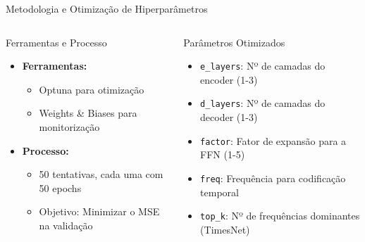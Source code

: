 \documentclass[aspectratio=169,xcolor=dvipsnames]{beamer}
\begin{document}
\begin{frame}{Metodologia e Otimização de Hiperparâmetros}
  \begin{columns}[T] %
      \begin{block}{Ferramentas e Processo}
        \begin{itemize}
          \item \textbf{Ferramentas:}
            \begin{itemize}
              \item Optuna para otimização
              \item Weights \& Biases para monitorização
            \end{itemize}
          \item \textbf{Processo:}
            \begin{itemize}
              \item 50 tentativas, cada uma com 50 epochs
              \item Objetivo: Minimizar o MSE na validação
            \end{itemize}
        \end{itemize}
      \end{block}

      \begin{exampleblock}{Parâmetros Otimizados}
        \begin{itemize}
          \item \texttt{e\_layers}: Nº de camadas do encoder (1-3)
          \item \texttt{d\_layers}: Nº de camadas do decoder (1-3)
          \item \texttt{factor}: Fator de expansão para a FFN (1-5)
          \item \texttt{freq}: Frequência para codificação temporal
          \item \texttt{top\_k}: Nº de frequências dominantes (TimesNet)
        \end{itemize}
      \end{exampleblock}
  \end{columns}
\end{frame}
\end{document}
